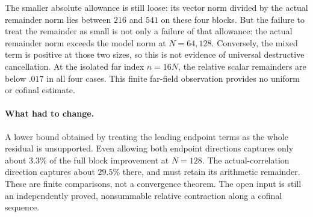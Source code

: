 The smaller absolute allowance is still loose: its vector norm divided
by the actual remainder norm lies between $216$ and $541$ on these
four blocks. But the failure to treat the remainder as small is not
only a failure of that allowance: the actual remainder norm exceeds
the model norm at $N=64,128$. Conversely, the mixed term is positive
at those two sizes, so this is not evidence of universal destructive
cancellation. At the isolated far index $n=16N$, the relative scalar
remainders are below $.017$ in all four cases. This finite far-field
observation provides no uniform or cofinal estimate.

\paragraph{What had to change.}
A lower bound obtained by treating the leading endpoint terms as the
whole residual is unsupported. Even allowing both endpoint directions
captures only about $3.3\%$ of the full block improvement at $N=128$.
The actual-correlation direction captures about $29.5\%$ there, and
must retain its arithmetic remainder. These are finite comparisons,
not a convergence theorem. The open input is still an independently
proved, nonsummable relative contraction along a cofinal sequence.
